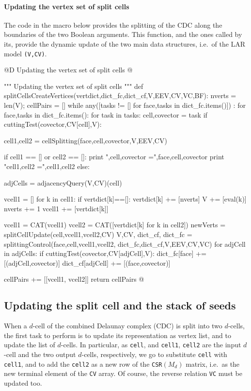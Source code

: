 \documentclass[11pt,oneside]{article}	%
\begin{document}
\paragraph{Updating the vertex set of split cells}
The code in the macro below provides the splitting of the CDC along the boundaries of the two Boolean arguments.
This function, and the ones called by its, provide the dynamic update of the two main data structures, i.e.~of the LAR model \texttt{(V,CV)}.

@D Updating the vertex set  of split cells
@{""" Updating the vertex set of split cells """
def splitCellsCreateVertices(vertdict,dict_fc,dict_cf,V,EEV,CV,VC,BF):
	nverts = len(V); cellPairs = []
	while any([tasks != [] for face,tasks in dict_fc.items()]) : 
		for face,tasks in dict_fc.items():
			for task in tasks:
				cell,covector = task
				if cuttingTest(covector,CV[cell],V):
					
					cell1,cell2 = cellSplitting(face,cell,covector,V,EEV,CV)
					
					if cell1 == [] or cell2 == []:
						print "\nface,cell,covector =",face,cell,covector
						print "cell1,cell2 =",cell1,cell2
					else:
					
						adjCells = adjacencyQuery(V,CV)(cell)
												
						vcell1 = []
						for k in cell1:
							if vertdict[k]==[]: 
								vertdict[k] += [nverts]
								V += [eval(k)]
								nverts += 1
							vcell1 += [vertdict[k]]
						
						vcell1 = CAT(vcell1)
						vcell2 = CAT([vertdict[k] for k in cell2])
						newVerts = splitCellUpdate(cell,vcell1,vcell2,CV)
						V,CV, dict_cf, dict_fc = splittingControl(face,cell,vcell1,vcell2, 
														dict_fc,dict_cf,V,EEV,CV,VC)
						for adjCell in adjCells:
							if cuttingTest(covector,CV[adjCell],V):
								dict_fc[face] += [(adjCell,covector)] 
								dict_cf[adjCell] += [(face,covector)] 
		
						cellPairs += [[vcell1, vcell2]]
	return cellPairs
@}


\subsection{Updating the split cell and the stack of seeds}

When a $d$-cell of the combined Delaunay complex (CDC) is split into two $d$-cells, the first task to perform is to update its representation as vertex list, and to update the list of $d$-cells. In particular, as \texttt{cell}, and \texttt{cell1}, \texttt{cell2} are the input $d$-cell and the two output $d$-cells, respectively, we go to substitute \texttt{cell} with \texttt{cell1}, and to add the \texttt{cell2} as a new row of the \texttt{CSR}$(M_d)$ matrix, i.e.~as the new terminal element of the \texttt{CV} array. Of course, the reverse relation \texttt{VC} must be updated too.
\end{document}
